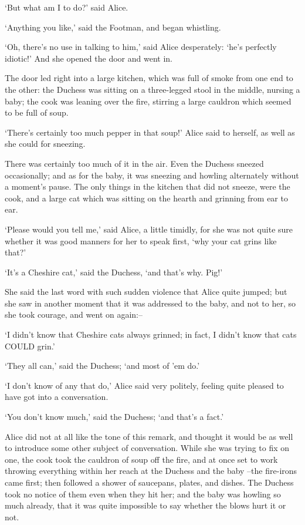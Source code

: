 \documentclass[12pt]{book}
\begin{document}
  `But what am I to do?' said Alice.

  `Anything you like,' said the Footman, and began whistling.

  `Oh, there's no use in talking to him,' said Alice desperately:
`he's perfectly idiotic!'  And she opened the door and went in.

  The door led right into a large kitchen, which was full of
smoke from one end to the other:  the Duchess was sitting on a
three-legged stool in the middle, nursing a baby; the cook was
leaning over the fire, stirring a large cauldron which seemed to
be full of soup.

  `There's certainly too much pepper in that soup!' Alice said to
herself, as well as she could for sneezing.

  There was certainly too much of it in the air.  Even the
Duchess sneezed occasionally; and as for the baby, it was
sneezing and howling alternately without a moment's pause.  The
only things in the kitchen that did not sneeze, were the cook,
and a large cat which was sitting on the hearth and grinning from
ear to ear.

  `Please would you tell me,' said Alice, a little timidly, for
she was not quite sure whether it was good manners for her to
speak first, `why your cat grins like that?'

  `It's a Cheshire cat,' said the Duchess, `and that's why.  Pig!'

  She said the last word with such sudden violence that Alice
quite jumped; but she saw in another moment that it was addressed
to the baby, and not to her, so she took courage, and went on
again:--

  `I didn't know that Cheshire cats always grinned; in fact, I
didn't know that cats COULD grin.'

  `They all can,' said the Duchess; `and most of 'em do.'

  `I don't know of any that do,' Alice said very politely,
feeling quite pleased to have got into a conversation.

  `You don't know much,' said the Duchess; `and that's a fact.'

  Alice did not at all like the tone of this remark, and thought
it would be as well to introduce some other subject of
conversation.  While she was trying to fix on one, the cook took
the cauldron of soup off the fire, and at once set to work
throwing everything within her reach at the Duchess and the baby
--the fire-irons came first; then followed a shower of saucepans,
plates, and dishes.  The Duchess took no notice of them even when
they hit her; and the baby was howling so much already, that it
was quite impossible to say whether the blows hurt it or not.
\end{document}
